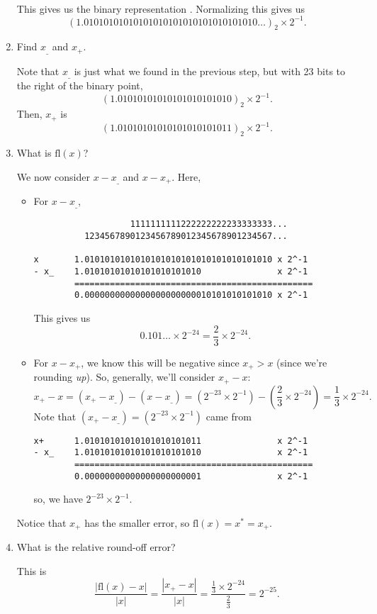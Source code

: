\documentclass[letterpaper]{article}
\begin{document}
\begin{mdframed}
\begin{enumerate}[(1)]
\begin{mdframed}
\[\begin{aligned}
            \end{aligned}\]
            This gives us the binary representation . Normalizing this gives us 
            \[(1.01010101010101010101010101010101010\hdots)_2 \times 2^{-1}.\]
        \end{mdframed}
        \item Find $x_\_$ and $x_+$.
        \begin{mdframed}
            Note that $x_\_$ is just what we found in the previous step, but with 23 bits to the right of the binary point,
            \[(1.01010101010101010101010)_2 \times 2^{-1}.\]
            Then, $x_+$ is 
            \[(1.01010101010101010101011)_2 \times 2^{-1}.\] 
        \end{mdframed}
        \item What is $\text{fl}(x)$?
        \begin{mdframed}
            We now consider $x - x_\_$ and $x - x_+$. Here, 
            \begin{itemize}
                \item For $x - x_\_$, 
                \begin{verbatim}
                   1111111111222222222233333333...
          1234567890123456789012345678901234567...

x       1.0101010101010101010101010101010101010 x 2^-1
- x_    1.01010101010101010101010               x 2^-1
        ===============================================
        0.0000000000000000000000010101010101010 x 2^-1\end{verbatim}
                This gives us \[0.101\hdots \times 2^{-24} = \frac{2}{3} \times 2^{-24}.\]
                    
                \item For $x - x_+$, we know this will be negative since $x_+ > x$ (since we're rounding \emph{up}). So, generally, we'll consider $x_+ - x$: 
                \[x_+ - x = (x_+ - x_\_) - (x - x_\_) = \left(2^{-23} \times 2^{-1}\right) - \left(\frac{2}{3} \times 2^{-24}\right) = \frac{1}{3} \times 2^{-24}.\]
                Note that $(x_+ - x_\_) = \left(2^{-23} \times 2^{-1}\right)$ came from 
                \begin{verbatim}
x+      1.01010101010101010101011               x 2^-1
- x_    1.01010101010101010101010               x 2^-1
        ===============================================
        0.00000000000000000000001               x 2^-1\end{verbatim}
                so, we have $2^{-23} \times 2^{-1}$. 
            \end{itemize}
            Notice that $x_{+}$ has the smaller error, so $\text{fl}(x) = x^* = x_{+}$. 
        \end{mdframed}
        \item What is the relative round-off error?  
        \begin{mdframed}
            This is 
            \[\frac{|\text{fl}(x) - x|}{|x|} = \frac{|x_+ - x|}{|x|} = \frac{\frac{1}{3} \times 2^{-24}}{\frac{2}{3}} = 2^{-25}.\]


\end{mdframed}
\end{enumerate}
\end{mdframed}
\end{document}
